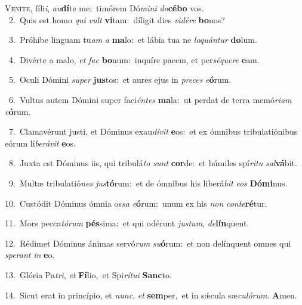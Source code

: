 \lettrine{\initial\textcolor{\initialcolor}{V}}{eníte,} fíli\-\textit{i}\-, \textit{au}\-\textbf{dí}te me:~\star timórem Dó\-\textit{mi}\-\textit{ni} \textit{do}\-\textbf{cé}\textbf{bo} vos.\\
{\numbfont\textcolor{\numbcolor}{~2.}}~Quis est homo \textit{qui} \textit{vult} \textbf{vi}\-tam:~\star díligit dies \textit{vi}\-\textit{dé}\textit{re} \textbf{bo}\-nos?\par
{\numbfont\textcolor{\numbcolor}{~3.}}~Próhibe linguam tu\textit{am} \textit{a} \textbf{ma}\-lo:~\star et lábia tua ne \textit{lo}\-\textit{quán}\textit{tur} \textbf{do}\-lum.\par
{\numbfont\textcolor{\numbcolor}{~4.}}~Divérte a malo, \textit{et} \textit{fac} \textbf{bo}\-num:~\star inquíre pacem, et per\-\textit{sé}\-\textit{que}\textit{re} \textbf{e}\-am.\par
{\numbfont\textcolor{\numbcolor}{~5.}}~Oculi Dómini \textit{su}\-\textit{per} \textbf{jus}\-tos:~\star et aures ejus in \textit{pre}\-\textit{ces} \textit{e}\-\textbf{ó}rum.\par
{\numbfont\textcolor{\numbcolor}{~6.}}~Vultus autem Dómini super faci\-\textit{én}\-\textit{tes} \textbf{ma}\-la:~\star ut perdat de terra memó\-\textit{ri}\-\textit{am} \textit{e}\-\textbf{ó}rum.\par
{\numbfont\textcolor{\numbcolor}{~7.}}~Clamavérunt justi, et Dóminus exau\-\textit{dí}\-\textit{vit} \textbf{e}\-os:~\star et ex ómnibus tribulatiónibus eórum li\-\textit{be}\-\textit{rá}\textit{vit} \textbf{e}\-os.\par
{\numbfont\textcolor{\numbcolor}{~8.}}~Juxta est Dóminus iis, qui tribulá\textit{to} \textit{sunt} \textbf{cor}\-de:~\star et húmiles spí\-\textit{ri}\-\textit{tu} \textit{sal}\-\textbf{vá}bit.\par
{\numbfont\textcolor{\numbcolor}{~9.}}~Multæ tribulatió\textit{nes} \textit{jus}\-\textbf{tó}rum:~\star et de ómnibus his liberá\textit{bit} \textit{e}\-\textit{os} \textbf{Dó}\-\textbf{mi}nus.\par
{\numbfont\textcolor{\numbcolor}{10.}}~Custódit Dóminus ómnia os\textit{sa} \textit{e}\-\textbf{ó}rum:~\star unum ex his \textit{non} \textit{con}\-\textit{te}\textbf{ré}tur.\par
{\numbfont\textcolor{\numbcolor}{11.}}~Mors pecca\-\textit{tó}\-\textit{rum} \textbf{pés}\-sima:~\star et qui odérunt \textit{jus}\-\textit{tum}, \textit{de}\-\textbf{lín}quent.\par
{\numbfont\textcolor{\numbcolor}{12.}}~Rédimet Dóminus ánimas servó\textit{rum} \textit{su}\-\textbf{ó}rum:~\star et non delínquent omnes qui \textit{spe}\-\textit{rant} \textit{in} \textbf{e}\-o.\par
{\numbfont\textcolor{\numbcolor}{13.}}~Glória Pa\-\textit{tri}\-, \textit{et} \textbf{Fí}\-lio,~\star et Spi\-\textit{rí}\-\textit{tu}\textit{i} \textbf{Sanc}\-to.\par
{\numbfont\textcolor{\numbcolor}{14.}}~Sicut erat in princípio, et \textit{nunc}\-, \textit{et} \textbf{sem}\-per,~\star et in sǽcula sæ\-\textit{cu}\-\textit{ló}\textit{rum}. \textbf{A}\-men.\par

